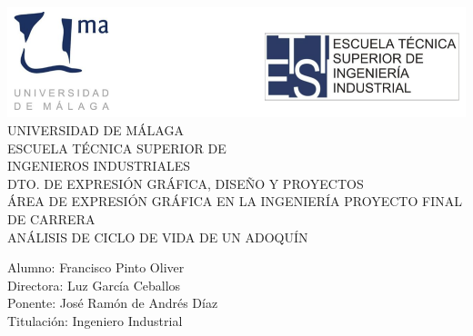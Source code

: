 \begin{titlepage}
\begin{center}
{\centering \includegraphics{img/portada.png}}
\vfill
{\LARGE UNIVERSIDAD DE MÁLAGA\\
ESCUELA TÉCNICA SUPERIOR DE\\[10pt]
INGENIEROS INDUSTRIALES}\\[25pt]
{\large DTO. DE EXPRESIÓN GRÁFICA, DISEÑO Y PROYECTOS\\
ÁREA DE EXPRESIÓN GRÁFICA EN LA INGENIERÍA}
\vfill
{\Large PROYECTO FINAL DE CARRERA\\[10pt]
ANÁLISIS DE CICLO DE VIDA DE UN ADOQUÍN}
\end{center}
\vfill
\begin{flushright}
Alumno: Francisco Pinto Oliver\\
Directora: Luz García Ceballos\\
Ponente: José Ramón de Andrés Díaz\\
Titulación: Ingeniero Industrial
\end{flushright}
\end{titlepage}
